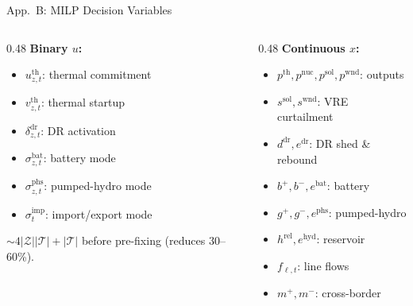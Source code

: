 \documentclass[aspectratio=169, 10pt]{beamer}
\newcommand{\backlink}[2]{\vfill\hfill\hyperlink{#1}{\beamerreturnbutton{\tiny #2}}}
\begin{document}
\begin{frame}{App.\ B: MILP Decision Variables}
\hypertarget{app:B}{}
\begin{columns}[T]
\begin{column}{0.48\textwidth}
\textbf{Binary $u$:}
\begin{itemize}
  \item $u^{\mathrm{th}}_{z,t}$: thermal commitment
  \item $v^{\mathrm{th}}_{z,t}$: thermal startup
  \item $\delta^{\mathrm{dr}}_{z,t}$: DR activation
  \item $\sigma^{\mathrm{bat}}_{z,t}$: battery mode
  \item $\sigma^{\mathrm{phs}}_{z,t}$: pumped-hydro mode
  \item $\sigma^{\mathrm{imp}}_{t}$: import/export mode
\end{itemize}
{\scriptsize $\sim 4|\mathcal{Z}||\mathcal{T}| + |\mathcal{T}|$ before pre-fixing (reduces 30--60\%).}
\end{column}
\begin{column}{0.48\textwidth}
\textbf{Continuous $x$:}
\begin{itemize}
  \item $p^{\mathrm{th}}, p^{\mathrm{nuc}}, p^{\mathrm{sol}}, p^{\mathrm{wnd}}$: outputs
  \item $s^{\mathrm{sol}}, s^{\mathrm{wnd}}$: VRE curtailment
  \item $d^{\mathrm{dr}}, e^{\mathrm{dr}}$: DR shed \& rebound
  \item $b^+, b^-, e^{\mathrm{bat}}$: battery
  \item $g^+, g^-, e^{\mathrm{phs}}$: pumped-hydro
  \item $h^{\mathrm{rel}}, e^{\mathrm{hyd}}$: reservoir
  \item $f_{\ell,t}$: line flows
  \item $m^+, m^-$: cross-border
\end{itemize}
\end{column}
\end{columns}
\backlink{main:milp}{Block 2: MILP}
\end{frame}
\end{document}
